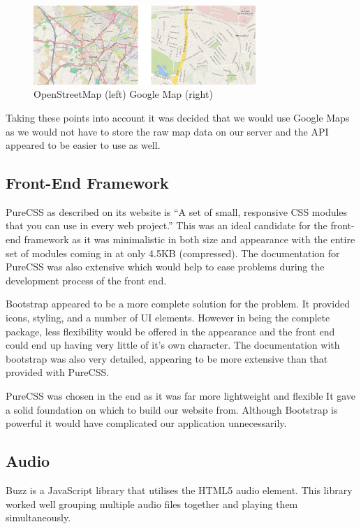 \documentclass{l3proj}
\begin{document}
\begin{figure}[ht!]
  \centering
\includegraphics[width=0.75\textwidth]{images/openstreetmap_google-map.jpg}
\caption{OpenStreetMap (left) Google Map (right)}
\end{figure}

Taking these points into account it was decided that we would use Google Maps as we would not have to store the raw map data on our server and the API appeared to be easier to use as well.


\subsection{Front-End Framework}

PureCSS as described on its website is “A set of small, responsive CSS modules that you can use in every web project.” This was an ideal candidate for the front-end framework as it was minimalistic in both size and appearance with the entire set of modules coming in at only 4.5KB (compressed). The documentation for PureCSS was also extensive which would help to ease problems during the development process of the front end.

Bootstrap appeared to be a more complete solution for the problem. It provided icons, styling, and a number of UI elements. However in being the complete package, less flexibility would be offered in the appearance and the front end could end up having very little of it’s own character. The documentation with bootstrap was also very detailed, appearing to be more extensive than that provided with PureCSS.

PureCSS was chosen in the end as it was far more lightweight and flexible It gave a solid foundation on which to build our website from. Although Bootstrap is powerful it would have complicated our application unnecessarily.


\subsection{Audio}

Buzz is a JavaScript library that utilises the HTML5 audio element. This library worked well grouping multiple audio files together and playing them simultaneously.
\end{document}
